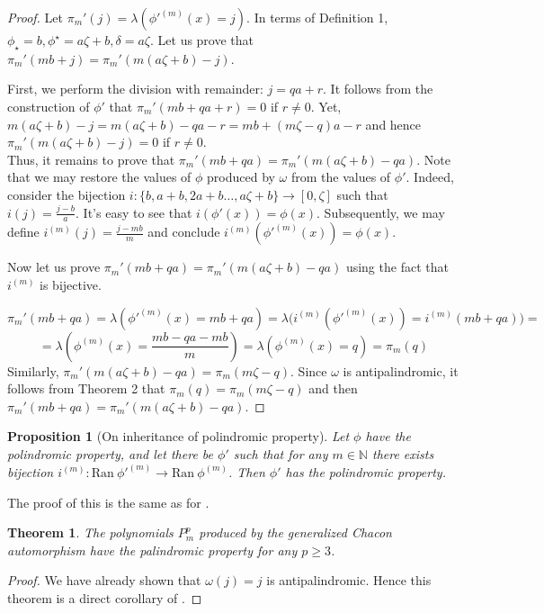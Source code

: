 \documentclass[a4paper]{article}
\theoremstyle{plain}
\newtheorem{theorem}{Theorem}[section]
\newtheorem{proposition}{Proposition}[section]
\theoremstyle{definition}
\begin{document}
\begin{proof}
Let $\pi_m'(j) = \lambda(\phi'^{(m)}(x)=j)$. In terms of Definition 1, $\phi_\star = b, \phi^\star = a\zeta + b, \delta = a\zeta$. Let us prove that $\pi_m'(mb + j) = \pi_m' (m(a\zeta+b)-j)$.

First, we perform the division with remainder: $j = qa + r$. It follows from the construction of $\phi'$ that $\pi_m'(mb + qa + r) = 0$ if $r \ne 0$. Yet, $m(a\zeta+b)-j = m(a\zeta+b)-qa - r = mb + (m\zeta -q)a - r$ and hence $\pi_m' (m(a\zeta+b)-j) = 0$ if $r \ne 0$.\\
Thus, it remains to prove that $\pi_m'(mb + qa) = \pi_m' (m(a\zeta+b)-qa)$.
Note that we may restore the values of $\phi$ produced by $\omega$ from the values of $\phi'$. Indeed, consider the bijection $i: \{b, a + b, 2a + b \ldots, a\zeta + b\} \rightarrow [0, \zeta]$ such that $i(j) = \frac{j-b}{a}$. It's easy to see that $i(\phi'(x))=\phi(x)$. Subsequently, we may define $i^{(m)}(j) = \frac{j-mb}{m}$ and conclude $i^{(m)}(\phi'^{(m)}(x))=\phi(x)$.

Now let us prove $\pi_m'(mb + qa) = \pi_m' (m(a\zeta+b)-qa)$ using the fact that $i^{(m)}$ is bijective.

\[\pi_m'(mb + qa) = \lambda(\phi'^{(m)}(x)=mb + qa) = \lambda\big(i^{(m)}(\phi'^{(m)}(x))=i^{(m)}(mb + qa)\big)  =\]\[= \lambda(\phi^{(m)}(x)= \frac{mb-qa-mb}{m})= \lambda(\phi^{(m)}(x)= q)=\pi_m(q)\]
Similarly, $\pi_m' (m(a\zeta+b)-qa) = \pi_m(m\zeta - q)$. Since $\omega$ is antipalindromic, it follows from Theorem 2 that $\pi_m(q) = \pi_m(m \zeta - q)$ and then $\pi_m'(mb + qa) = \pi_m' (m(a\zeta+b)-qa)$.
\end{proof}
\begin{proposition}[On inheritance of polindromic property]
Let $\phi$ have the polindromic property, and let there be $\phi'$ such that for any $m \in \mathbb{N}$ there exists bijection $i^{(m)}: \mathrm{Ran}\ \phi'^{(m)} \rightarrow \mathrm {Ran}\ \phi^{(m)}$. Then $\phi'$ has the polindromic property.
\end{proposition}
The proof of this is the same as for .

\begin{theorem}
The polynomials $P_m^p$ produced by the generalized Chacon automorphism have the palindromic property for any $p \ge 3$.
\end{theorem}
\begin{proof}
We have already shown that $\omega(j)=j$ is antipalindromic. Hence this theorem is a direct corollary of  .
\end{proof}
\end{document}
